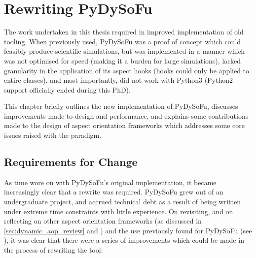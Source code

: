\chapter{Rewriting PyDySoFu}\label{chap:pdsf_rewrite}


The work undertaken in this thesis required in improved implementation of old
tooling. When previously used, PyDySoFu was a proof of concept which could
feasibly produce scientific simulations, but was implemented in a manner which
was not optimised for speed (making it a burden for large simulations), lacked
granularity in the application of its aspect hooks (hooks could only be applied
to entire classes), and most importantly, did not work with Python3 (Python2
support officially ended during this PhD).

This chapter briefly outlines the new implementation of PyDySoFu, discusses
improvements made to design and performance, and explains some contributions
made to the design of aspect orientation frameworks which addresses some core
issues raised with the paradigm. 


\section{Requirements for Change}\label{sec:pdsf3requirements}

As time wore on with PyDySoFu's original implementation, it became increasingly
clear that a rewrite was required. PyDySoFu grew out of an undergraduate
project, and accrued technical debt as a result of being written under extreme
time constraints with little experience. On revisiting, and on reflecting on
other aspect orientation frameworks (as discussed in
\cref{sec:dynamic_aop_review} and \cite{dynamicAOchitchyan}) and the use
previously found for PyDySoFu (see \cite{wallis2018caise, wallis2018genetic}),
it was clear that there were a series of improvements which could be made in the
process of rewriting the tool:

